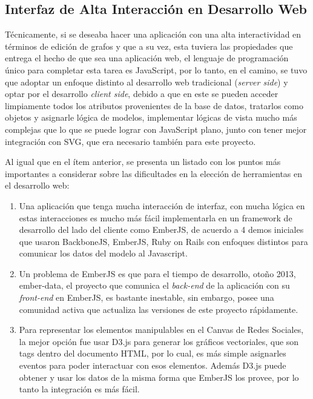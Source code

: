 
\subsection{Interfaz de Alta Interacción en Desarrollo Web} %
\label{sub:interfaz_de_alta_interaccion_en_desarrollo_web}

Técnicamente, si se deseaba hacer una aplicación con una alta interactividad en términos de edición de grafos y que a su vez, esta tuviera las propiedades que entrega el hecho de que sea una aplicación web, el lenguaje de programación único para completar esta tarea es JavaScript, por lo tanto, en el camino, se tuvo que adoptar un enfoque distinto al desarrollo web tradicional (\emph{server side}) y optar por el desarrollo \emph{client side}, debido a que en este se pueden acceder limpiamente todos los atributos provenientes de la base de datos, tratarlos como objetos y asignarle lógica de modelos, implementar lógicas de vista mucho más complejas que lo que se puede lograr con JavaScript plano, junto con tener mejor integración con SVG, que era necesario también para este proyecto.

Al igual que en el ítem anterior, se presenta un listado con los puntos más importantes a considerar sobre las dificultades en la elección de herramientas en el desarrollo web:

  \begin{enumerate}
    \item Una aplicación que tenga mucha interacción de interfaz, con mucha lógica en estas interacciones es mucho más fácil implementarla en un framework de desarrollo del lado del cliente como EmberJS, de acuerdo a 4 demos iniciales que usaron BackboneJS, EmberJS, Ruby on Rails con enfoques distintos para comunicar los datos del modelo al Javascript.
    
    \item Un problema de EmberJS es que para el tiempo de desarrollo, otoño 2013, ember-data, el proyecto que comunica el \emph{back-end} de la aplicación con su \emph{front-end} en EmberJS, es bastante inestable, sin embargo, posee una comunidad activa que actualiza las versiones de este proyecto rápidamente.
    
    \item Para representar los elementos manipulables en el Canvas de Redes Sociales, la mejor opción fue usar D3.js para generar los gráficos vectoriales, que son tags dentro del documento HTML, por lo cual, es más simple asignarles eventos para poder interactuar con esos elementos. Además D3.js puede obtener y usar los datos de la misma forma que EmberJS los provee, por lo tanto la integración es más fácil.
  \end{enumerate}

